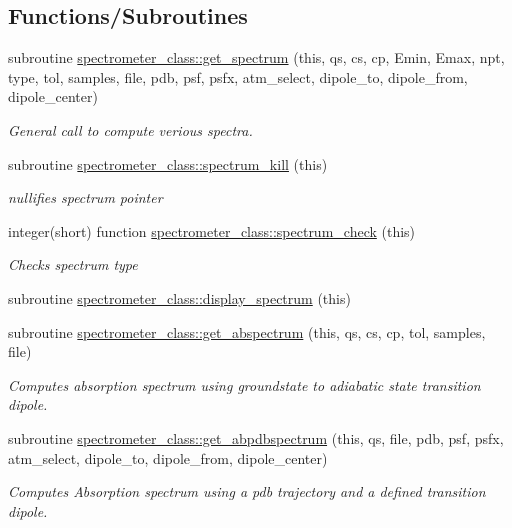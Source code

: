 \subsection*{Functions/\+Subroutines}
\begin{DoxyCompactItemize}
\item 
subroutine \hyperlink{namespacespectrometer__class_a068171434fa75613677e6357291df1fe}{spectrometer\+\_\+class\+::get\+\_\+spectrum} (this, qs, cs, cp, Emin, Emax, npt, type, tol, samples, file, pdb, psf, psfx, atm\+\_\+select, dipole\+\_\+to, dipole\+\_\+from, dipole\+\_\+center)
\begin{DoxyCompactList}\small\item\em General call to compute verious spectra. \end{DoxyCompactList}\item 
subroutine \hyperlink{namespacespectrometer__class_aabaa46560b8ea49cd16b6c11a8a2fe65}{spectrometer\+\_\+class\+::spectrum\+\_\+kill} (this)
\begin{DoxyCompactList}\small\item\em nullifies spectrum pointer \end{DoxyCompactList}\item 
integer(short) function \hyperlink{namespacespectrometer__class_a94382eb7e533e6a74dd79200ca0e38ed}{spectrometer\+\_\+class\+::spectrum\+\_\+check} (this)
\begin{DoxyCompactList}\small\item\em Checks spectrum type \end{DoxyCompactList}\item 
subroutine \hyperlink{namespacespectrometer__class_a3f9fc6096d581c5a7094174b47898d10}{spectrometer\+\_\+class\+::display\+\_\+spectrum} (this)
\item 
subroutine \hyperlink{namespacespectrometer__class_ad2c4936524c8702e1c4e53a54a043f31}{spectrometer\+\_\+class\+::get\+\_\+abspectrum} (this, qs, cs, cp, tol, samples, file)
\begin{DoxyCompactList}\small\item\em Computes absorption spectrum using groundstate to adiabatic state transition dipole. \end{DoxyCompactList}\item 
subroutine \hyperlink{namespacespectrometer__class_af1fc802879075c7e5e42ef4baac69445}{spectrometer\+\_\+class\+::get\+\_\+abpdbspectrum} (this, qs, file, pdb, psf, psfx, atm\+\_\+select, dipole\+\_\+to, dipole\+\_\+from, dipole\+\_\+center)
\begin{DoxyCompactList}\small\item\em Computes Absorption spectrum using a pdb trajectory and a defined transition dipole. \end{DoxyCompactList}\end{DoxyCompactItemize}
